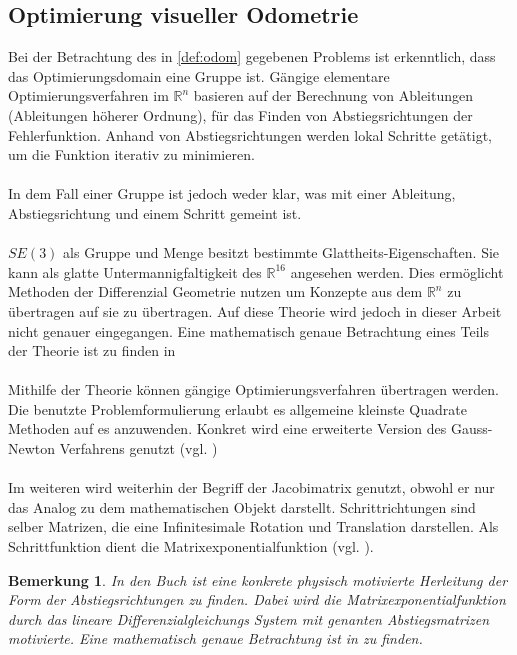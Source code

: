 \documentclass[12pt,DIV=15,BCOR=15mm,twoside,headsepline,abstract=true,listof=totoc,bibliography=totoc]{scrreprt}
\newtheorem{remark}{Bemerkung}[chapter]
\theoremstyle{remark}    %
\begin{document}
    \subsection{Optimierung visueller Odometrie}
    Bei der Betrachtung des in \ref{def:odom} gegebenen Problems ist erkenntlich, dass das Optimierungsdomain eine Gruppe ist.
    Gängige elementare Optimierungsverfahren im $\mathbb{R}^n$ basieren auf der Berechnung von
    Ableitungen (Ableitungen höherer Ordnung), für das Finden von Abstiegsrichtungen der Fehlerfunktion. Anhand von Abstiegsrichtungen werden lokal
    Schritte getätigt, um die Funktion iterativ zu minimieren.\\\\
    In dem Fall einer Gruppe ist jedoch weder klar, was mit einer Ableitung, Abstiegsrichtung und einem Schritt gemeint ist. \\\\
    $SE(3)$ als Gruppe und Menge besitzt bestimmte Glattheits-Eigenschaften. Sie kann als glatte Untermannigfaltigkeit des $\mathbb{R}^{16}$ angesehen werden. 
    Dies ermöglicht Methoden der Differenzial Geometrie nutzen um Konzepte aus dem $\mathbb{R}^n$ zu übertragen auf sie zu übertragen. 
    Auf diese Theorie wird jedoch in dieser Arbeit nicht genauer eingegangen. Eine mathematisch genaue Betrachtung eines Teils der Theorie ist zu finden in 
    \cite[Kap.9]{Lueck2005}\cite[Kap.8.4]{Absil2008}\cite[Kap.2] {Murray1994}\cite[Apd.A]{Murray1994}\\\\
    Mithilfe der Theorie können gängige Optimierungsverfahren übertragen werden. Die benutzte Problemformulierung erlaubt es allgemeine kleinste Quadrate 
    Methoden auf es anzuwenden. Konkret wird eine erweiterte Version des Gauss-Newton Verfahrens genutzt (vgl. \cite[Kap.8.4]{Absil2008}\cite{Park_2017_ICCV})\\\\
    Im weiteren wird weiterhin der Begriff der Jacobimatrix genutzt, obwohl er nur das Analog zu dem mathematischen Objekt darstellt.
    Schrittrichtungen sind selber Matrizen, die eine Infinitesimale Rotation und Translation darstellen. Als Schrittfunktion 
    dient die Matrixexponentialfunktion (vgl. \cite[Kap.2] {Murray1994}).
    \begin{remark}
    In den Buch \cite[Kap.2] {Murray1994} ist eine konkrete physisch motivierte Herleitung der Form der Abstiegsrichtungen zu finden.
    Dabei wird die Matrixexponentialfunktion durch das lineare Differenzialgleichungs System mit genanten Abstiegsmatrizen motivierte. Eine 
    mathematisch genaue Betrachtung ist in \cite[Apd.A]{Murray1994} zu finden.
    \end{remark}
\end{document}
